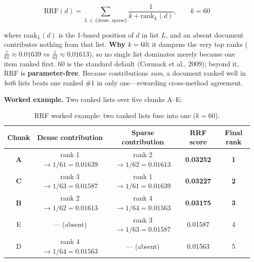 \documentclass[11pt,a4paper,oneside]{report}
\begin{document}
\begin{equation}
\mathrm{RRF}(d) = \sum_{L \,\in\, \{\text{dense},\,\text{sparse}\}} \frac{1}{k + \mathrm{rank}_L(d)}, \qquad k = 60
\end{equation}

where $\mathrm{rank}_L(d)$ is the 1-based position of $d$ in list $L$, and an absent document
contributes nothing from that list. \textbf{Why $k=60$:} it dampens the very top ranks
($\tfrac{1}{61}\approx 0.01639$ vs $\tfrac{1}{62}\approx 0.01613$), so no single list dominates
merely because one item ranked first. 60 is the standard default (Cormack et al., 2009); beyond it,
RRF is \textbf{parameter-free}. Because contributions \emph{sum}, a document ranked well in
\emph{both} lists beats one ranked \#1 in only one---rewarding cross-method agreement.

\textbf{Worked example.} Two ranked lists over five chunks A--E:

\begin{table}[htbp]
\centering
\caption{RRF worked example: two ranked lists fuse into one ($k=60$).}
\label{tab:rrf}
\begin{tabular}{|c|c|c|c|c|}
\hline
\rowcolor{ink}
{\color{white}\textbf{Chunk}} & {\color{white}\textbf{Dense contribution}} & {\color{white}\textbf{Sparse contribution}} & {\color{white}\textbf{RRF score}} & {\color{white}\textbf{Final rank}}\\
\hline
\textbf{A} & rank 1 $\to 1/61=0.01639$ & rank 2 $\to 1/62=0.01613$ & \textbf{0.03252} & \textbf{1}\\ \hline
\textbf{C} & rank 3 $\to 1/63=0.01587$ & rank 1 $\to 1/61=0.01639$ & \textbf{0.03227} & \textbf{2}\\ \hline
\textbf{B} & rank 2 $\to 1/62=0.01613$ & rank 4 $\to 1/64=0.01563$ & \textbf{0.03175} & \textbf{3}\\ \hline
E & --- (absent) & rank 3 $\to 1/63=0.01587$ & 0.01587 & 4\\ \hline
D & rank 4 $\to 1/64=0.01563$ & --- (absent) & 0.01563 & 5\\ \hline
\end{tabular}
\end{table}
\end{document}
